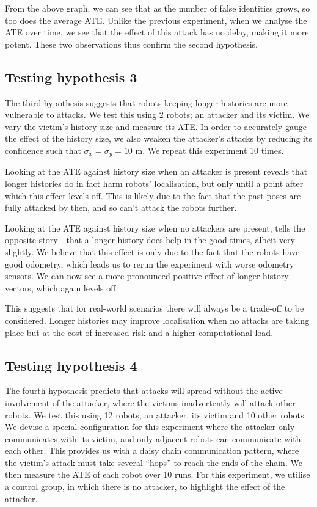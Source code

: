 From the above graph, we can see that as the number of false identities grows, so too does the average ATE. Unlike the previous experiment, when we analyse the ATE over time, we see that the effect of this attack has no delay, making it more potent. These two observations thus confirm the second hypothesis.

\subsection{Testing hypothesis 3}
The third hypothesis suggests that robots keeping longer histories are more vulnerable to attacks. We test this using 2 robots; an attacker and its victim. We vary the victim's history size and measure its ATE. In order to accurately gauge the effect of the history size, we also weaken the attacker's attacks by reducing its confidence such that $\sigma_x = \sigma_y = 10$ m. We repeat this experiment 10 times.


Looking at the ATE against history size when an attacker is present reveals that longer histories do in fact harm robots' localisation, but only until a point after which this effect levels off. This is likely due to the fact that the past poses are fully attacked by then, and so can't attack the robots further.

Looking at the ATE against history size when no attackers are present, tells the opposite story - that a longer history does help in the good times, albeit very slightly. We believe that this effect is only due to the fact that the robots have good odometry, which leads us to rerun the experiment with worse odometry sensors. We can now see a more pronounced positive effect of longer history vectors, which again levels off. %

This suggests that for real-world scenarios there will always be a trade-off to be considered. Longer histories may improve localisation when no attacks are taking place but at the cost of increased risk and a higher computational load.

\subsection{Testing hypothesis 4}
The fourth hypothesis predicts that attacks will spread without the active involvement of the attacker, where the victims inadvertently will attack other robots. We test this using 12 robots; an attacker, its victim and 10 other robots. We devise a special configuration for this experiment where the attacker only communicates with its victim, and only adjacent robots can communicate with each other. This provides us with a daisy chain communication pattern, where the victim's attack must take several ``hops'' to reach the ends of the chain. We then measure the ATE of each robot over 10 runs. For this experiment, we utilise a control group, in which there is no attacker, to highlight the effect of the attacker.

